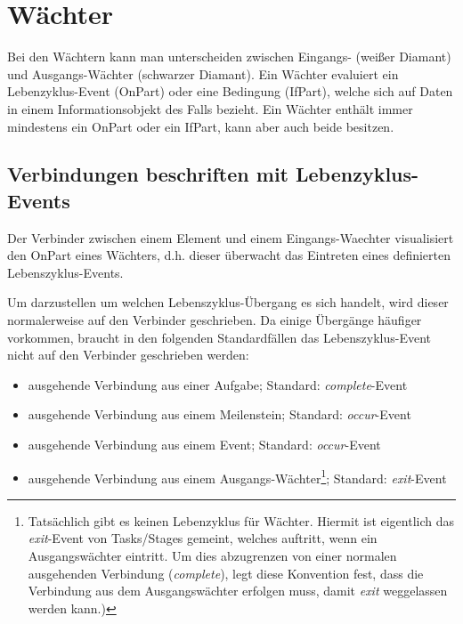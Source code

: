 \documentclass[12pt,report]{../../Templates/snetTeaching}
\begin{document}







\section{Wächter}

Bei den Wächtern kann man unterscheiden zwischen Eingangs- (weißer Diamant) und Ausgangs-Wächter (schwarzer Diamant). Ein Wächter evaluiert ein Lebenzyklus-Event (OnPart) oder eine Bedingung (IfPart), welche sich auf Daten in einem Informationsobjekt des Falls bezieht. Ein Wächter enthält immer mindestens ein OnPart oder ein IfPart, kann aber auch beide besitzen.

\subsection{Verbindungen beschriften mit Lebenzyklus-Events}
\label{konv:CMMN_VerbindungBeschriften}

Der Verbinder zwischen einem Element und einem Eingangs-\gls{Waechter} visualisiert den OnPart eines Wächters, d.h. dieser überwacht das Eintreten eines definierten Lebenszyklus-Events. 

Um darzustellen um welchen Lebenszyklus-Übergang es sich handelt, wird dieser normalerweise auf den Verbinder geschrieben. Da einige Übergänge häufiger vorkommen, braucht in den folgenden Standardfällen das Lebenszyklus-Event nicht auf den Verbinder geschrieben werden: 
\begin{itemize}
\item ausgehende Verbindung aus einer Aufgabe; Standard: \emph{complete}-Event
\item ausgehende Verbindung aus einem Meilenstein; Standard: \emph{occur}-Event
\item ausgehende Verbindung aus einem Event; Standard: \emph{occur}-Event
\item ausgehende Verbindung aus einem Ausgangs-Wächter\footnote{Tatsächlich gibt es keinen Lebenzyklus für Wächter. Hiermit ist eigentlich das \emph{exit}-Event von Tasks/Stages gemeint, welches auftritt, wenn ein Ausgangswächter eintritt. Um dies abzugrenzen von einer normalen ausgehenden Verbindung (\emph{complete}), legt diese Konvention fest, dass die Verbindung aus dem Ausgangswächter erfolgen muss, damit \emph{exit} weggelassen werden kann.)}; Standard: \emph{exit}-Event
\end{itemize}
\end{document}

